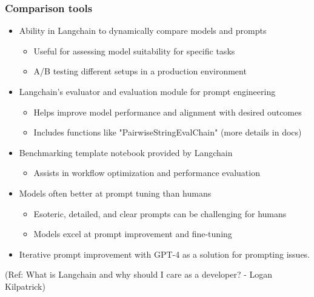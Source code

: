 \begin{frame}[fragile]\frametitle{Comparison tools}

\begin{itemize}
\item Ability in Langchain to dynamically compare models and prompts
	\begin{itemize}
	\item Useful for assessing model suitability for specific tasks
	\item A/B testing different setups in a production environment
	\end{itemize}
\item Langchain's evaluator and evaluation module for prompt engineering
	\begin{itemize}
	\item Helps improve model performance and alignment with desired outcomes
	\item Includes functions like "PairwiseStringEvalChain" (more details in docs)
	\end{itemize}
\item Benchmarking template notebook provided by Langchain
	\begin{itemize}
	\item Assists in workflow optimization and performance evaluation
	\end{itemize}
\item Models often better at prompt tuning than humans
	\begin{itemize}
	\item Esoteric, detailed, and clear prompts can be challenging for humans
	\item Models excel at prompt improvement and fine-tuning
	\end{itemize}
\item Iterative prompt improvement with GPT-4 as a solution for prompting issues.
\end{itemize}

{\tiny (Ref: What is Langchain and why should I care as a developer? - Logan Kilpatrick)}

\end{frame}